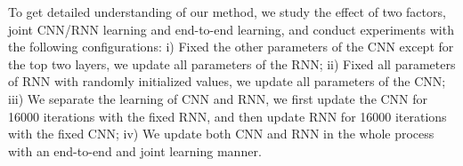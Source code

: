 \documentclass[10pt,twocolumn,letterpaper]{article}
\begin{document}








To get detailed understanding of our method, we study the effect of two factors, \ie joint CNN/RNN learning and end-to-end learning, and conduct experiments with the following configurations: i) Fixed the other parameters of the CNN except for the top two layers, we update all parameters of the RNN; ii) Fixed all parameters of RNN with randomly initialized values, we update all parameters of the CNN; iii) We separate the learning of CNN and RNN, \ie we first update the CNN for 16000 iterations with the fixed RNN, and then update RNN for 16000 iterations with the fixed CNN; iv) We update both CNN and RNN in the whole process with an end-to-end and joint learning manner.
\end{document}
